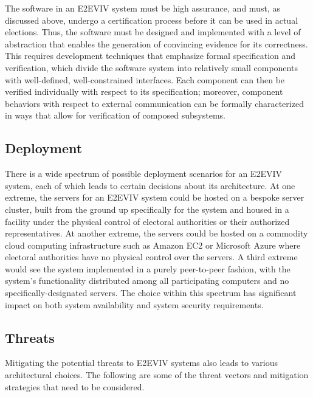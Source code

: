 The software in an E2EVIV system must be high assurance, and must, as
discussed above, undergo a certification process before it can be used
in actual elections. Thus, the software must be designed and
implemented with a level of abstraction that enables the generation of
convincing evidence for its correctness. This requires development
techniques that emphasize formal specification and verification, which
divide the software system into relatively small components with
well-defined, well-constrained interfaces. Each component can then be
verified individually with respect to its specification; moreover,
component behaviors with respect to external communication can be
formally characterized in ways that allow for verification of composed
subsystems.


\subsection{Deployment}

There is a wide spectrum of possible deployment scenarios for an
E2EVIV system, each of which leads to certain decisions about its
architecture. At one extreme, the servers for an E2EVIV system could
be hosted on a bespoke server cluster, built from the ground up
specifically for the system and housed in a facility under the
physical control of electoral authorities or their authorized
representatives. At another extreme, the servers could be hosted on a
commodity cloud computing infrastructure such as Amazon EC2 or
Microsoft Azure where electoral authorities have no physical control
over the servers. A third extreme would see the system implemented in
a purely peer-to-peer fashion, with the system's functionality
distributed among all participating computers and no
specifically-designated servers. The choice within this spectrum has
significant impact on both system availability and system security
requirements.

\subsection{Threats}
\label{sec:threats}

Mitigating the potential threats to E2EVIV systems also leads to
various architectural choices. The following are some of the threat
vectors and mitigation strategies that need to be considered.

